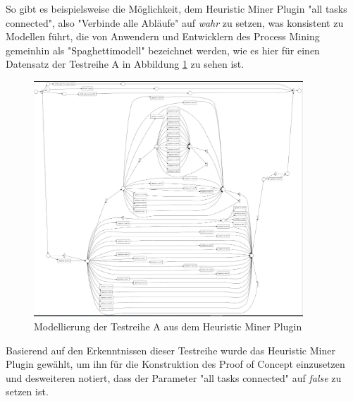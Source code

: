 So gibt es beispielsweise die Möglichkeit, dem Heuristic Miner Plugin "all tasks connected", also "Verbinde alle Abläufe" auf \textit{wahr} zu setzen, was konsistent zu Modellen führt, die von Anwendern und Entwicklern des Process Mining gemeinhin als "Spaghettimodell" bezeichnet werden, wie es hier für einen Datensatz der Testreihe A in Abbildung \ref{fig:A_heuristic_spagh} zu sehen ist.
\begin{figure}[!ht]
    \centering
    \includegraphics[width=0.9\textwidth,]{figures/Appbildungen/A_underfitted.PNG}
    \caption{Modellierung der Testreihe A aus dem Heuristic Miner Plugin}
    \label{fig:A_heuristic_spagh}
\end{figure}

Basierend auf den Erkenntnissen dieser Testreihe wurde das Heuristic Miner Plugin gewählt, um ihn für die Konstruktion des Proof of Concept einzusetzen und desweiteren notiert, dass der Parameter "all tasks connected" auf \textit{false} zu setzen ist.





